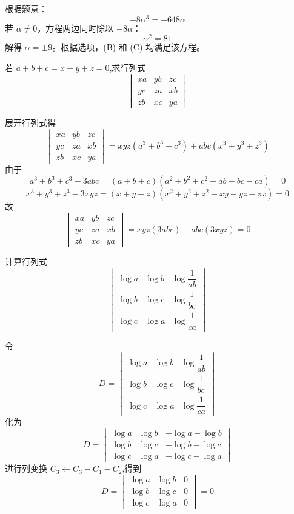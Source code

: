 \begin{questions}
\begin{solution}
\[\]
根据题意：
\[
-8\alpha^3 = -648\alpha
\]
若 $\alpha \neq 0$，方程两边同时除以 $-8\alpha$：
\[
\alpha^2 = 81
\]
解得 $\alpha = \pm 9$。根据选项，(B) 和 (C) 均满足该方程。
\end{solution}
    \question 若 $a+b+c=x+y+z=0$,求行列式 
    \[
    \begin{vmatrix}
    xa & yb & zc \\
    yc & za & xb \\
    zb & xc & ya
    \end{vmatrix}
    \]
    \begin{solution}
        展开行列式得
        \[
        \begin{vmatrix}
        xa & yb & zc \\
        yc & za & xb \\
        zb & xc & ya
        \end{vmatrix}=xyz(a^3+b^3+c^3)+abc(x^3+y^3+z^3)
        \]由于
        \[
        a^3+b^3+c^3-3abc=(a+b+c)(a^2+b^2+c^2-ab-bc-ca)=0
        \] 
        \[
        x^3+y^3+z^3-3xyz=(x+y+z)(x^2+y^2+z^2-xy-yz-zx)=0
        \]
        故
        \[
        \begin{vmatrix}
        xa & yb & zc \\
        yc & za & xb \\
        zb & xc & ya
        \end{vmatrix}=xyz(3abc)-abc(3xyz)=0\]
    \end{solution}

    \question 计算行列式
    \[
    \begin{vmatrix} 
    \log a & \log b & \log \dfrac{1}{ab} \\[8pt]
    \log b & \log c & \log \dfrac{1}{bc} \\[8pt]
    \log c & \log a & \log \dfrac{1}{ca} 
    \end{vmatrix}
    \]
    \begin{solution}
        令\[
        D=\begin{vmatrix} 
        \log a & \log b & \log \dfrac{1}{ab} \\[8pt]
        \log b & \log c & \log \dfrac{1}{bc} \\[8pt]
        \log c & \log a & \log \dfrac{1}{ca} 
        \end{vmatrix}
        \]
        化为
        \[
        D=\begin{vmatrix} 
        \log a & \log b & -\log a - \log b \\ 
        \log b & \log c & -\log b - \log c \\ 
        \log c & \log a & -\log c - \log a 
        \end{vmatrix}
        \]
        进行列变换 $C_3 \leftarrow C_3 - C_1 - C_2$,得到
        \[
        D=\begin{vmatrix} 
        \log a & \log b & 0 \\ 
        \log b & \log c & 0 \\ 
        \log c & \log a & 0 
        \end{vmatrix} = 0
        \]
    \end{solution}


\end{questions}
